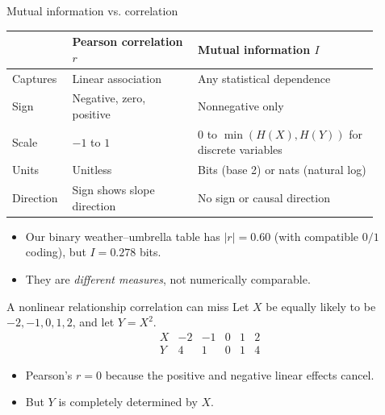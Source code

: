 \documentclass[aspectratio=43,11pt]{beamer}
\begin{document}
\begin{frame}{Mutual information vs. correlation}
\footnotesize
\begin{tabular}{p{0.12\linewidth}p{0.32\linewidth}p{0.46\linewidth}}
\toprule
& Pearson correlation $r$ & Mutual information $I$\\
\midrule
Captures & Linear association & Any statistical dependence\\ \hline
Sign & Negative, zero, positive & Nonnegative only\\ \hline
Scale & $-1$ to $1$ & $0$ to $\min(H(X),H(Y))$ {\tiny for discrete variables}\\ \hline
Units & Unitless & Bits {\tiny(base 2)} or nats {\tiny(natural log)}\\ \hline
Direction & Sign shows slope direction & No sign or causal direction\\
\bottomrule
\end{tabular}
\medskip
\begin{itemize}
\item Our binary weather--umbrella table has $\lvert r\rvert=0.60$ (with compatible $0/1$ coding), but $I=0.278$ bits.
\item They are \emph{different measures}, not numerically comparable.
\end{itemize}
\end{frame}

\begin{frame}{A nonlinear relationship correlation can miss}
Let $X$ be equally likely to be $-2,-1,0,1,2$, and let $Y=X^2$.
\[
\begin{array}{c|ccccc}
X & -2&-1&0&1&2\\\hline
Y &4&1&0&1&4
\end{array}
\]
\begin{itemize}
\item Pearson's $r=0$ because the positive and negative linear effects cancel.
\item But $Y$ is completely determined by $X$.
\end{itemize}
\end{frame}
\end{document}
